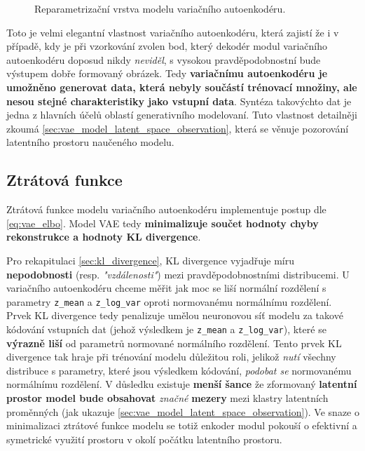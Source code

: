 \begin{figure}[H]
    \inputminted[linenos]{python}{code_snippets/vae_reparametrization.py}
    \caption{Reparametrizační vrstva modelu variačního autoenkodéru.}
    \label{code:vae_reparametrization_layer}
\end{figure}

Toto je velmi elegantní vlastnost variačního autoenkodéru, která zajistí že i v případě, kdy je při vzorkování zvolen bod, který dekodér modul variačního autoenkodéru doposud nikdy \emph{neviděl}, s vysokou pravděpodobnostní bude výstupem dobře formovaný obrázek.
Tedy \textbf{variačnímu autoenkodéru je umožněno generovat data, která nebyly součástí trénovací množiny, ale nesou stejné charakteristiky jako vstupní data}.
Syntéza takovýchto dat je jedna z hlavních účelů oblastí generativního modelovaní.
Tuto vlastnost detailněji zkoumá \autoref{sec:vae_model_latent_space_observation}, která se věnuje pozorování latentního prostoru naučeného modelu.

\subsection{Ztrátová funkce}
\label{sec:vae_model_loss_function}
Ztrátová funkce modelu variačního autoenkodéru implementuje postup dle \autoref{eq:vae_elbo}.
Model VAE tedy \textbf{minimalizuje součet hodnoty chyby rekonstrukce a hodnoty KL divergence}.

Pro rekapitulaci \autoref{sec:kl_divergence}, KL divergence vyjadřuje míru \textbf{nepodobnosti} (resp. \emph{"vzdálenosti"}) mezi pravděpodobnostními distribucemi.
U variačního autoenkodéru chceme měřit jak moc se liší normální rozdělení s parametry \lstinline{z_mean} a \lstinline{z_log_var} oproti normovanému normálnímu rozdělení.
Prvek KL divergence tedy penalizuje umělou neuronovou síť modelu za takové kódování vstupních dat (jehož výsledkem je \lstinline{z_mean} a \lstinline{z_log_var}), které se \textbf{výrazně liší} od parametrů normované normálního rozdělení.
Tento prvek KL divergence tak hraje při trénování modelu důležitou roli, jelikož \emph{nutí} všechny distribuce s parametry, které jsou výsledkem kódování, \emph{podobat se} normovanému normálnímu rozdělení. 
V důsledku existuje \textbf{menší šance} že zformovaný \textbf{latentní prostor model bude obsahovat} \emph{značné} \textbf{mezery} mezi klastry latentních proměnných (jak ukazuje \autoref{sec:vae_model_latent_space_observation}).
Ve snaze o minimalizaci ztrátové funkce modelu se totiž enkoder modul pokouší o efektivní a symetrické využití prostoru v okolí počátku latentního prostoru.

